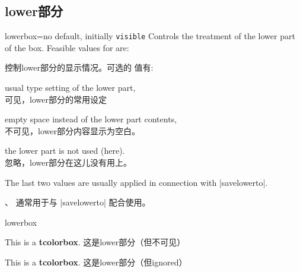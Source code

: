 \setcounter{section}{4}
\setcounter{subsection}{3}
\setcounter{subsubsection}{0}

\subsection{lower部分}

\begin{docTcbKey}{lowerbox}{=}{no default, initially \texttt{visible}}
Controls the treatment of the lower part of the box.
Feasible values for  are:

控制lower部分的显示情况。可选的  值有:
\begin{DescriptionL}{}
\item[\docValue{visible}]usual type setting of the lower part,
\\可见，lower部分的常用设定

\item[\docValue{invisible}]empty space instead of the lower part contents,
\\不可见，lower部分内容显示为空白。

\item[\docValue{ignored}]the lower part is not used (here).
\\忽略，lower部分在这儿没有用上。
\end{DescriptionL}

The last two values are usually applied in connection with |savelowerto|.

、 通常用于与 |savelowerto| 配合使用。

\begin{exdispExample}{lowerbox}
\begin{tcolorbox}[lowerbox=invisible,colback=white]
This is a \textbf{tcolorbox}.
\tcblower
这是lower部分（但不可见）
\end{tcolorbox}

\begin{tcolorbox}[lowerbox=ignored,colback=white]
This is a \textbf{tcolorbox}.
\tcblower
这是lower部分（但ignored）
\end{tcolorbox}
\end{exdispExample}
\end{docTcbKey}


